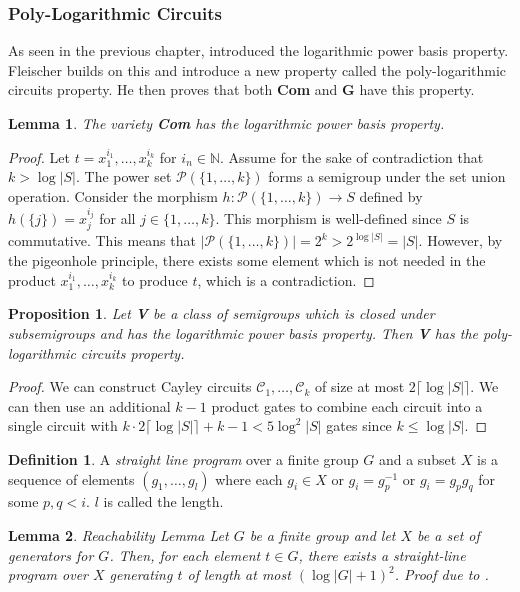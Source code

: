 \documentclass[a4paper,12pt]{article}
\theoremstyle{plain}
\newtheorem{lemma}{Lemma}
\newtheorem{prop}{Proposition}
\theoremstyle{definition}
\newtheorem{defn}{Definition}
\theoremstyle{remark}
\begin{document}
\subsubsection{Poly-Logarithmic Circuits}
As seen in the previous chapter, \cite{Barrington2001} introduced the logarithmic power basis property. Fleischer builds on this and introduce a new property called the poly-logarithmic circuits property. He then proves that both \textbf{Com} and \textbf{G} have this property.
\begin{lemma}
  The \textit{variety} \textbf{Com} has the logarithmic power basis property.
\end{lemma}
\begin{proof}
  Let $t=x_1^{i_1},\dots,x_k^{i_k}$ for $i_n\in\mathbb{N}$. Assume for the sake of contradiction that $k>\log|S|$. The power set $\mathcal{P}(\{1,\dots,k\})$ forms a semigroup under the set union operation. Consider the morphism $h:\mathcal{P}(\{1,\dots,k\})\to S$ defined by $h(\{j\})=x_j^{i_j}$ for all $j\in\{1,\dots,k\}$.
  This morphism is well-defined since $S$ is commutative. This means that $|\mathcal{P}(\{1,\dots,k\})|=2^k>2^{\log|S|}=|S|$. However, by the pigeonhole principle, there exists some element which is not needed in the product $x_1^{i_1},\dots,x_k^{i_k}$ to produce $t$, which is a contradiction.
\end{proof}
\begin{prop}
  Let \textbf{V} be a class of semigroups which is closed under subsemigroups and has the logarithmic power basis property. Then \textbf{V} has the poly-logarithmic circuits property.
\end{prop}
\begin{proof}
  We can construct Cayley circuits $\mathcal{C}_1,\dots,\mathcal{C}_k$ of size at most $2\lceil\log|S|\rceil$. We can then use an additional $k-1$ product gates to combine each circuit into a single circuit with $k\cdot2\lceil\log|S|\rceil+k-1<5\log^2|S|$ gates since $k\leq\log|S|$.
\end{proof}
\begin{defn}
  A \textit{straight line program} over a finite group $G$ and a subset $X$ is a sequence of elements $(g_1,\dots,g_l)$ where each $g_i\in X$ or $g_i=g_p^{-1}$ or $g_i=g_pg_q$ for some $p,q<i$. $l$ is called the length.
\end{defn}
\begin{lemma}{Reachability Lemma}
  Let $G$ be a finite group and let $X$ be a set of generators for $G$. Then, for each element $t\in G$, there exists a straight-line program over $X$ generating $t$ of length at most $(\log|G|+1)^2$. Proof due to \cite{Babai1991}.
\end{lemma}
\end{document}
